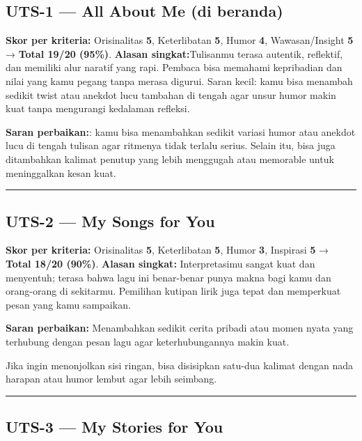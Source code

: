 \documentclass[
  letterpaper,
  DIV=11,
  numbers=noendperiod]{scrreprt}
\begin{document}
\subsection{UTS-1 --- All About Me (di
beranda)}\label{uts-1-all-about-me-di-beranda}

\textbf{Skor per kriteria:} Orisinalitas \textbf{5}, Keterlibatan
\textbf{5}, Humor \textbf{4}, Wawasan/Insight \textbf{5} → \textbf{Total
19/20 (95\%)}. \textbf{Alasan singkat:}Tulisanmu terasa autentik,
reflektif, dan memiliki alur naratif yang rapi. Pembaca bisa memahami
kepribadian dan nilai yang kamu pegang tanpa merasa digurui. Saran
kecil: kamu bisa menambah sedikit twist atau anekdot lucu tambahan di
tengah agar unsur humor makin kuat tanpa mengurangi kedalaman refleksi.

\textbf{Saran perbaikan:}: kamu bisa menambahkan sedikit variasi humor
atau anekdot lucu di tengah tulisan agar ritmenya tidak terlalu serius.
Selain itu, bisa juga ditambahkan kalimat penutup yang lebih menggugah
atau memorable untuk meninggalkan kesan kuat.

\begin{center}\rule{0.5\linewidth}{0.5pt}\end{center}

\subsection{UTS-2 --- My Songs for You}\label{uts-2-my-songs-for-you-1}

\textbf{Skor per kriteria:} Orisinalitas \textbf{5}, Keterlibatan
\textbf{5}, Humor \textbf{3}, Inspirasi \textbf{5} → \textbf{Total 18/20
(90\%)}. \textbf{Alasan singkat:} Interpretasimu sangat kuat dan
menyentuh; terasa bahwa lagu ini benar-benar punya makna bagi kamu dan
orang-orang di sekitarmu. Pemilihan kutipan lirik juga tepat dan
memperkuat pesan yang kamu sampaikan.

\textbf{Saran perbaikan:} Menambahkan sedikit cerita pribadi atau momen
nyata yang terhubung dengan pesan lagu agar keterhubungannya makin kuat.

Jika ingin menonjolkan sisi ringan, bisa disisipkan satu-dua kalimat
dengan nada harapan atau humor lembut agar lebih seimbang.

\begin{center}\rule{0.5\linewidth}{0.5pt}\end{center}

\subsection{UTS-3 --- My Stories for
You}\label{uts-3-my-stories-for-you-1}
\end{document}

